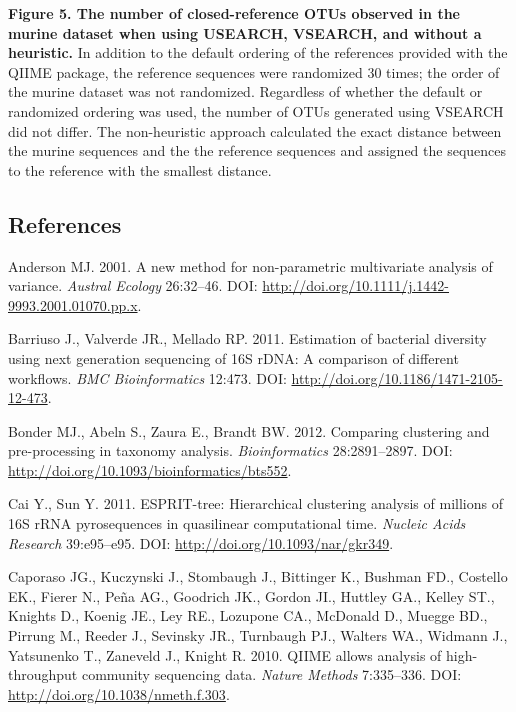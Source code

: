 \documentclass[11pt,]{article}
\begin{document}
\textbf{Figure 5. The number of closed-reference OTUs observed in the
murine dataset when using USEARCH, VSEARCH, and without a heuristic.} In
addition to the default ordering of the references provided with the
QIIME package, the reference sequences were randomized 30 times; the
order of the murine dataset was not randomized. Regardless of whether
the default or randomized ordering was used, the number of OTUs
generated using VSEARCH did not differ. The non-heuristic approach
calculated the exact distance between the murine sequences and the the
reference sequences and assigned the sequences to the reference with the
smallest distance.

\newpage






\newpage

\subsection*{References}\label{references}

Anderson MJ. 2001. A new method for non-parametric multivariate analysis
of variance. \emph{Austral Ecology} 26:32--46. DOI:
\url{http://doi.org/10.1111/j.1442-9993.2001.01070.pp.x}.

Barriuso J., Valverde JR., Mellado RP. 2011. Estimation of bacterial
diversity using next generation sequencing of 16S rDNA: A comparison of
different workflows. \emph{BMC Bioinformatics} 12:473. DOI:
\url{http://doi.org/10.1186/1471-2105-12-473}.

Bonder MJ., Abeln S., Zaura E., Brandt BW. 2012. Comparing clustering
and pre-processing in taxonomy analysis. \emph{Bioinformatics}
28:2891--2897. DOI: \url{http://doi.org/10.1093/bioinformatics/bts552}.

Cai Y., Sun Y. 2011. ESPRIT-tree: Hierarchical clustering analysis of
millions of 16S rRNA pyrosequences in quasilinear computational time.
\emph{Nucleic Acids Research} 39:e95--e95. DOI:
\url{http://doi.org/10.1093/nar/gkr349}.

Caporaso JG., Kuczynski J., Stombaugh J., Bittinger K., Bushman FD.,
Costello EK., Fierer N., Peña AG., Goodrich JK., Gordon JI., Huttley
GA., Kelley ST., Knights D., Koenig JE., Ley RE., Lozupone CA., McDonald
D., Muegge BD., Pirrung M., Reeder J., Sevinsky JR., Turnbaugh PJ.,
Walters WA., Widmann J., Yatsunenko T., Zaneveld J., Knight R. 2010.
QIIME allows analysis of high-throughput community sequencing data.
\emph{Nature Methods} 7:335--336. DOI:
\url{http://doi.org/10.1038/nmeth.f.303}.
\end{document}
